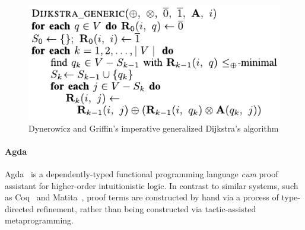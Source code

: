 \begin{figure}[ht]
\includegraphics{algorithm.pdf}
\caption{Dynerowicz and Griffin's imperative generalized Dijkstra's algorithm}
\label{fig.algorithm}
\end{figure}


\paragraph{Agda}

Agda~\cite{norell_dependently_2009} is a dependently-typed functional programming language \emph{cum} proof assistant for higher-order intuitionistic logic.
In contrast to similar systems, such as Coq~\cite{bertot_short_2008} and Matita~\cite{asperti_matita_2011}, proof terms are constructed by hand via a process of type-directed refinement, rather than being constructed via tactic-assisted metaprogramming.

